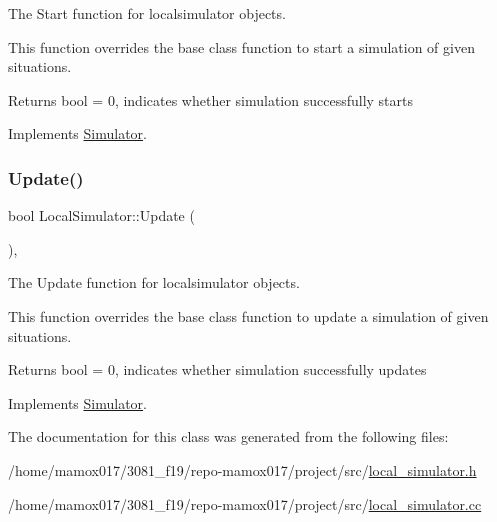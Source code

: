 The Start function for localsimulator objects. 

This function overrides the base class function to start a simulation of given situations.

\begin{DoxyReturn}{Returns}
bool = 0, indicates whether simulation successfully starts 
\end{DoxyReturn}


Implements \hyperlink{classSimulator_a0db68bef442ba6061a5f38189bbe3512}{Simulator}.

\mbox{\label{classLocalSimulator_ac98ba1a401ad204dd5169934adb02684}} 
\subsubsection{\texorpdfstring{Update()}{Update()}}
{\footnotesize\ttfamily bool Local\+Simulator\+::\+Update (\begin{DoxyParamCaption}{ }\end{DoxyParamCaption})\hspace{0.3cm}{\ttfamily [override]}, {\ttfamily [virtual]}}



The Update function for localsimulator objects. 

This function overrides the base class function to update a simulation of given situations.

\begin{DoxyReturn}{Returns}
bool = 0, indicates whether simulation successfully updates 
\end{DoxyReturn}


Implements \hyperlink{classSimulator_a7a5a1cbfa1e0cf9b82fe9d2e4b3b80ae}{Simulator}.



The documentation for this class was generated from the following files\+:\begin{DoxyCompactItemize}
\item 
/home/mamox017/3081\+\_\+f19/repo-\/mamox017/project/src/\hyperlink{local__simulator_8h}{local\+\_\+simulator.\+h}\item 
/home/mamox017/3081\+\_\+f19/repo-\/mamox017/project/src/\hyperlink{local__simulator_8cc}{local\+\_\+simulator.\+cc}\end{DoxyCompactItemize}
